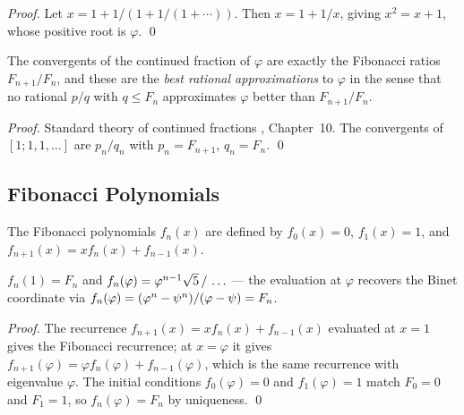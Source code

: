 \begin{proof}
Let \(x = 1 + 1/(1 + 1/(1+\cdots))\).  Then \(x = 1 + 1/x\), giving
\(x^2 = x + 1\), whose positive root is \(\varphi\). \qed
\end{proof}

\begin{corollary}\label{cor:best-approx}
The convergents of the continued fraction of \(\varphi\) are exactly the
Fibonacci ratios \(F_{n+1}/F_n\), and these are the \emph{best rational
approximations} to \(\varphi\) in the sense that no rational \(p/q\) with
\(q \leq F_n\) approximates \(\varphi\) better than \(F_{n+1}/F_n\).
\end{corollary}

\begin{proof}
Standard theory of continued fractions \cite{hardy_wright}, Chapter~10.
The convergents of \([1;1,1,\ldots]\) are \(p_n/q_n\) with \(p_n = F_{n+1}\),
\(q_n = F_n\). \qed
\end{proof}

\subsection{Fibonacci Polynomials}\label{subsec:ch7-fib-polys}

\begin{definition}\label{def:fib-poly}
The Fibonacci polynomials \(f_n(x)\) are defined by
\(f_0(x) = 0\), \(f_1(x) = 1\), and
\(f_{n+1}(x) = x f_n(x) + f_{n-1}(x)\).
\end{definition}

\begin{proposition}\label{prop:fib-poly-eval}
\(f_n(1) = F_n\) and \(f_n(\varphi) = \varphi^{n-1}\sqrt{5}\,/\,\ldots\)
— the evaluation at \(\varphi\) recovers the Binet coordinate via
\(f_n(\varphi) = (\varphi^{n} - \psi^n)/(\varphi - \psi) = F_n\).
\end{proposition}

\begin{proof}
The recurrence \(f_{n+1}(x) = xf_n(x) + f_{n-1}(x)\) evaluated at \(x = 1\)
gives the Fibonacci recurrence; at \(x = \varphi\) it gives
\(f_{n+1}(\varphi) = \varphi f_n(\varphi) + f_{n-1}(\varphi)\), which is the
same recurrence with eigenvalue \(\varphi\).
The initial conditions \(f_0(\varphi) = 0\) and \(f_1(\varphi) = 1\) match
\(F_0 = 0\) and \(F_1 = 1\), so \(f_n(\varphi) = F_n\) by uniqueness.
\qed
\end{proof}

